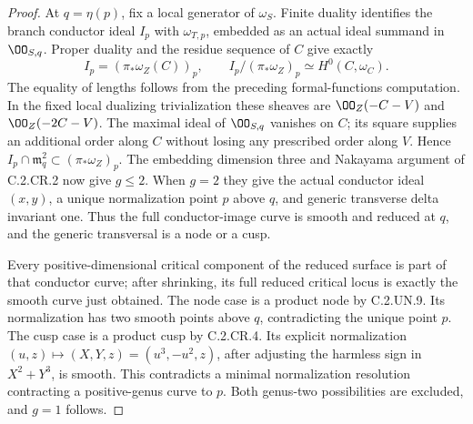 \begin{proof}
At $q=\eta(p)$, fix a local generator of $\omega_S$.
Finite duality identifies the branch conductor
ideal $I_p$ with $\omega_{T,p}$, embedded as an
actual ideal summand in $\OO_{S,q}$. Proper
duality and the residue sequence of $C$ give
exactly
\[
 I_p=(\pi_*\omega_Z(C))_p,\qquad
 I_p/(\pi_*\omega_Z)_p\simeq H^0(C,\omega_C).
 \tag{C.UNCR.3}
\]
The equality of lengths follows from the preceding
formal-functions computation. In the fixed local
dualizing trivialization these sheaves are
$\OO_Z(-C-V)$ and $\OO_Z(-2C-V)$.
The maximal ideal of $\OO_{S,q}$ vanishes on $C$;
its square supplies an additional order along
$C$ without losing any prescribed order along
$V$. Hence
$I_p\cap\mathfrak m_q^2\subset(\pi_*\omega_Z)_p$.
The embedding dimension three and Nakayama
argument of C.2.CR.2 now give $g\le2$. When
$g=2$ they give the actual conductor ideal
$(x,y)$, a unique normalization point $p$ above
$q$, and generic transverse delta invariant
one. Thus the full conductor-image curve is
smooth and reduced at $q$, and the generic
transversal is a node or a cusp.

Every positive-dimensional critical component
of the reduced surface is part of that conductor
curve; after shrinking, its full reduced critical
locus is exactly the smooth curve just obtained.
The node case is a product node by C.2.UN.9.
Its normalization has two smooth points above
$q$, contradicting the unique point $p$.
The cusp case is a product cusp by C.2.CR.4.
Its explicit normalization
$(u,z)\mapsto(X,Y,z)=(u^3,-u^2,z)$, after
adjusting the harmless sign in $X^2+Y^3$,
is smooth. This contradicts a minimal
normalization resolution contracting a
positive-genus curve to $p$. Both genus-two
possibilities are excluded, and $g=1$ follows.
\end{proof}
